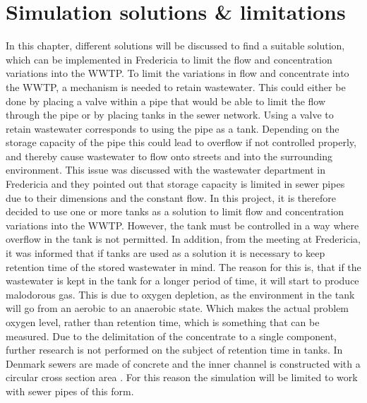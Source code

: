 
\chapter{Simulation solutions \& limitations }\label{ch:simulation_solution_and_limitation}
In this chapter, different solutions will be discussed to find a suitable solution, which can be implemented in Fredericia to limit the flow and concentration variations into the WWTP.
To limit the variations in flow and concentrate into the WWTP, a mechanism is needed to retain wastewater. This could either be done by placing a valve within a pipe that would be able to limit the flow through the pipe or by placing tanks in the sewer network.%
Using a valve to retain wastewater corresponds to using the pipe as a tank. Depending on the storage capacity of the pipe this could lead to overflow if not controlled properly, and thereby cause wastewater to flow onto streets and into the surrounding environment. %
This issue was discussed with the wastewater department in Fredericia and they pointed out that storage capacity is limited in sewer pipes due to their dimensions and the constant flow. 
In this project, it is therefore decided to use one or more tanks as a solution to limit flow and concentration variations into the WWTP. %
However, the tank must be controlled in a way where overflow in the tank is not permitted. %
In addition, from the meeting at Fredericia, it was informed that if tanks are used as a solution it is necessary to keep retention time of the stored wastewater in mind. The reason for this is, that if the wastewater is kept in the tank for a longer period of time, it will start to produce malodorous gas. This is due to oxygen depletion, as the environment in the tank will go from an aerobic to an anaerobic state. Which makes the actual problem oxygen level, rather than retention time, which is something that can be measured. Due to the delimitation of the concentrate to a single component, further research is not performed on the subject of retention time in tanks.
In Denmark sewers are made of concrete and the inner channel is constructed with a circular cross section area \cite{betonhaandbogen}. For this reason the simulation will be limited to work with sewer pipes of this form.


